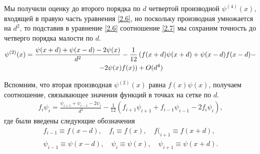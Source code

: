 \documentclass[14pt]{extarticle}
\newcommand{\lb}{\left(}
\newcommand{\rb}{\right)}
\newcommand{\psider}[1]{\psi^{(#1)}(x)}
\begin{document}
Мы получили оценку до второго порядка по $d$ четвертой производной $\psider{4}$, входящей в правую часть уравнения \eqref{2.6}, но поскольку производная умножается на $d^2$, то подставив в уравнение \eqref{2.6} соотношение \eqref{2.7} мы сохраним точность до четверго порядка малости по $d$.
\begin{gather}
	\psider{2} = \frac{\psi(x + d) + \psi(x - d) - 2 \psi(x)}{d^2} - \frac{1}{12} \lb f(x + d) \psi(x + d) + \psi(x - d) f(x - d) - \right. \notag \\
	\left. - 2 \psi(x) f(x) \rb + O(d^4) \label{2.7.2} 
\end{gather}

Вспомним, что вторая производная $\psider{2}$ равна $f(x)\psi(x)$,  получаем соотношение, связывающее значения функций в точках на сетке по $d$. 
\begin{gather}
	f_i \psi_i = \frac{\psi_{i + 1} + \psi_{i - 1} - 2 \psi_i}{d^2} - \frac{1}{12} \lb f_{i + 1} \psi_{i + 1} + f_{i - 1} \psi_{i - 1} - 2 f_i \psi_i \rb \label{2.8},
\end{gather}
где были введены следующие обозначения
\begin{gather}
	f_{i - 1} \equiv f(x - d), \quad f_i \equiv f(x), \quad f(_{i + 1} \equiv f(x + d) \label{2.8.1},\\ 
	\psi_{i - 1} \equiv \psi(x - d), \quad \psi_i \equiv \psi(x), \quad \psi_{i + 1} \equiv \psi(x + d). \label{2.8.2}
\end{gather}
\end{document}
